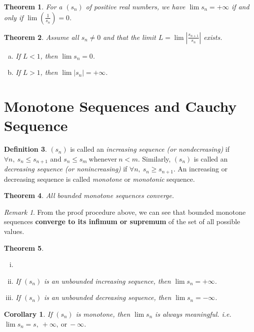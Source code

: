 \documentclass[12pt, lettersize]{book}
\theoremstyle{plain}
\newtheorem{thm}{Theorem}[section]
\newtheorem{cor}{Corollary}[thm]
\theoremstyle{definition}
\newtheorem{dfn}[thm]{Definition}
\theoremstyle{remark}
\newtheorem*{rem}{Remark}
\begin{document}
	\begin{thm}
		For a $(s_n)$ of \emph{positive} real numbers, we have $\lim s_n=+\infty$ if and only if $\lim(\frac{1}{s_n})=0$.
	\end{thm}
	
	\begin{thm}
		Assume all $s_n\neq0$ and that the limit $L=\lim\left|\frac{s_{n+1}}{s_n}\right|$ exists.
		\begin{enumerate}[(a)]
			\item If $L<1$, then $\lim s_n=0$.
			\item If $L>1$, then $\lim |s_n|=+\infty$.
		\end{enumerate} 
	\end{thm}
	
	\newpage
	\section{Monotone Sequences and Cauchy Sequence}
	\begin{dfn}
		$(s_n)$ is called an \emph{increasing sequence (or nondecreasing)} if $\forall n,\ s_n\leq s_{n+1}$ and $s_n\leq s_m\ \text{whenever}\ n<m$.
		Similarly, $(s_n)$ is called an \emph{decreasing sequence (or nonincreasing)} if $\forall n,\ s_n\geq s_{n+1}$. An increasing or decreasing sequence is called \emph{monotone} or \emph{monotonic} sequence.
	\end{dfn}
	
	\begin{thm}\label{def:bounded monotone seq}
		All bounded monotone sequences converge.
	\end{thm}
	\begin{rem}
		From the proof procedure above, we can see that bounded monotone sequences \textbf{converge to its infimum or supremum} of the set of all possible values.
	\end{rem}
	
	\begin{thm}\label{def:unbounded monotone seq}
		\begin{enumerate}[(i)]
			\item[]
			\item If $(s_n)$ is an unbounded increasing sequence, then $\lim s_n=+\infty$.
			\item If $(s_n)$ is an unbounded decreasing sequence, then $\lim s_n=-\infty$.
		\end{enumerate}
	\end{thm}
	\begin{cor}
		If $(s_n)$ is monotone, then $\lim s_n$ is always meaningful. i.e. $\lim s_n=s,\ +\infty,\ \text{or}\ -\infty$.
	\end{cor}
	
\end{document}
